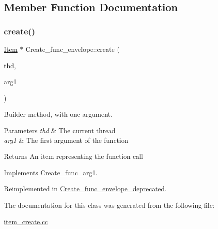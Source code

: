 \subsection{Member Function Documentation}
\mbox{\label{classCreate__func__envelope_a7d2f9842672a527c792c1f25ee7a45f9}} 
\subsubsection{\texorpdfstring{create()}{create()}}
{\footnotesize\ttfamily \mbox{\hyperlink{classItem}{Item}} $\ast$ Create\+\_\+func\+\_\+envelope\+::create (\begin{DoxyParamCaption}\item[{T\+HD $\ast$}]{thd,  }\item[{\mbox{\hyperlink{classItem}{Item}} $\ast$}]{arg1 }\end{DoxyParamCaption})\hspace{0.3cm}{\ttfamily [virtual]}}

Builder method, with one argument. 
\begin{DoxyParams}{Parameters}
{\em thd} & The current thread \\
\hline
{\em arg1} & The first argument of the function \\
\hline
\end{DoxyParams}
\begin{DoxyReturn}{Returns}
An item representing the function call 
\end{DoxyReturn}


Implements \mbox{\hyperlink{classCreate__func__arg1_a3e9a98f755cd82c3e762e334c955a8c9}{Create\+\_\+func\+\_\+arg1}}.



Reimplemented in \mbox{\hyperlink{classCreate__func__envelope__deprecated_ad9485348b65fe2ecd722cf2810fa0e9c}{Create\+\_\+func\+\_\+envelope\+\_\+deprecated}}.



The documentation for this class was generated from the following file\+:\begin{DoxyCompactItemize}
\item 
\mbox{\hyperlink{item__create_8cc}{item\+\_\+create.\+cc}}\end{DoxyCompactItemize}
